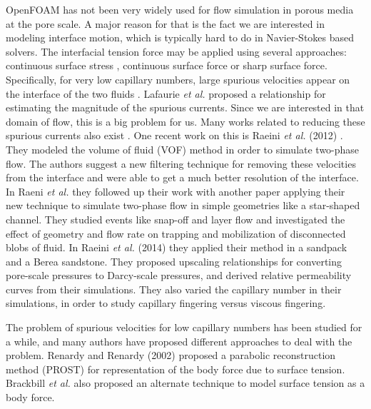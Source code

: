 OpenFOAM has not been very widely used for flow simulation in porous media at the pore scale. A major reason for that is the fact we are interested in modeling interface motion, which is typically hard to do in Navier-Stokes based solvers. The interfacial tension force may be applied using several approaches: continuous surface stress \cite{}, continuous surface force \cite{} or sharp surface force\cite{}. Specifically, for very low capillary numbers, large spurious velocities appear on the interface of the two fluids \cite{}. Lafaurie \emph{et al.} \cite{}proposed a relationship for estimating the magnitude of the spurious currents. Since we are interested in that domain of flow, this is a big problem for us.  Many works related to reducing these spurious currents also exist \cite{}. One recent work on this is Raeini \emph{et al.} (2012) \cite{}. They modeled the volume of fluid (VOF) method in order to simulate two-phase flow. The authors suggest a new filtering technique for removing these velocities from the interface and were able to get a much better resolution of the interface. In Raeni \emph{et al.} \cite{} they followed up their work with another paper applying their new technique to simulate two-phase flow in simple geometries like a star-shaped channel. They studied events like snap-off and layer flow and investigated the effect of geometry and flow rate on trapping and mobilization of disconnected blobs of fluid. In Raeini \emph{et al.} (2014) \cite{} they applied their method in a sandpack and a Berea sandstone. They proposed upscaling relationships for converting pore-scale pressures to Darcy-scale pressures, and derived relative permeability curves from their simulations. They also varied the capillary number in their simulations, in order to study capillary fingering versus viscous fingering. 

The problem of spurious velocities for low capillary numbers has been studied for a while, and many authors have proposed different approaches to deal with the problem. Renardy and Renardy (2002) \cite{} proposed a parabolic reconstruction method (PROST) for representation of the body force due to surface tension. Brackbill \emph{et al.} \cite{} also proposed an alternate technique to model surface tension as a body force.

